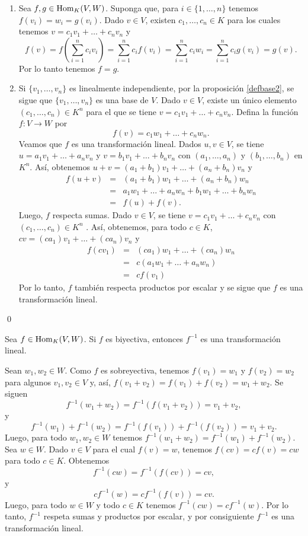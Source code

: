 \dem
\begin{enumerate}
\item Sea $f,g\in\operatorname{Hom}_K(V,W)$. Suponga que, para $i\in\{1,\ldots,n\}$ tenemos $f(v_i)=w_i=g(v_i)$. Dado $v\in V$, existen $c_1,\ldots,c_n\in K$ para los cuales tenemos $v=c_1v_1+\ldots+c_nv_n$ y 
\[
f(v)=f\left(\sum_{i=1}^nc_iv_i\right)=\sum_{i=1}^nc_if(v_i)=\sum_{i=1}^nc_iw_i=\sum_{i=1}^nc_ig(v_i)=g(v).
\]
Por lo tanto tenemos $f=g$.
\item Si $\{v_1,\ldots,v_n\}$ es linealmente independiente, por la proposici\'on \ref{defbase2}, se sigue que $\{v_1,\ldots,v_n\}$ es una base de $V$. Dado $v\in V$, existe un \'unico elemento $(c_1,\ldots, c_n)\in K^n$ para el que se tiene $v=c_1v_1+\ldots+c_nv_n$. Defina la funci\'on $f:V\rightarrow W$ por
\[
f(v)=c_1w_1+\ldots+c_nw_n.
\]
Veamos que $f$ es una transformaci\'on lineal. Dados $u,v\in V$, se tiene $u=a_1v_1+\ldots+a_nv_n$ y $v=b_1v_1+\ldots+b_nv_n$ con $(a_1,\ldots, a_n)$ y $(b_1,\ldots, b_n)$ en $K^n$. As\'i, obtenemos $u+v =  (a_1+b_1)v_1+\ldots+(a_n+b_n)v_n$ y
\begin{eqnarray*}
f(u+v) & = & (a_1+b_1)w_1+\ldots+(a_n+b_n)w_n\\
     & = & a_1w_1+\ldots+a_nw_n+ b_1w_1+\ldots+b_nw_n\\
     & = & f(u)+f(v).
\end{eqnarray*} 
Luego, $f$ respecta sumas.
Dado $v\in V$, se tiene $v=c_1v_1+\ldots+c_nv_n$ con $(c_1,\ldots, c_n)\in K^n$ . As\'i, obtenemos, para todo $c\in K$, $cv = (ca_1)v_1+\ldots+(ca_n)v_n$ y
\begin{eqnarray*}
f(cv_1) & = & (ca_1)w_1+\ldots+(ca_n)w_n\\
     & = & c(a_1w_1+\ldots+a_nw_n)\\
     & = & cf(v_1)
\end{eqnarray*}
Por lo tanto, $f$ tambi\'en respecta productos por escalar y se sigue que $f$ es una transformaci\'on lineal.
\end{enumerate}\qed

\begin{prop}
Sea $f\in\operatorname{Hom}_K(V,W)$. Si $f$ es biyectiva, entonces $f^{-1}$ es una transformaci\'on lineal. 
\end{prop}

\dem Sean $w_1,w_2\in W$. Como $f$ es sobreyectiva, tenemos $f(v_1)=w_1$ y $f(v_2)=w_2$ para algunos $v_1,v_2\in V$ y, as\'i, $f(v_1+v_2)=f(v_1)+f(v_2)=w_1+w_2$. Se siguen
\[
f^{-1}(w_1+w_2)=f^{-1}\left(f(v_1+v_2)\right)=v_1+v_2,
\] 
y
\[
f^{-1}(w_1)+f^{-1}(w_2)=f^{-1}\left(f(v_1)\right)+f^{-1}\left(f(v_2)\right)=v_1+v_2.
\]
Luego, para todo $w_1,w_2\in W$ tenemos  $f^{-1}(w_1+w_2)=f^{-1}(w_1)+f^{-1}(w_2)$.\\
Sea $w\in W$. Dado $v\in V$ para el cual $f(v)=w$, tenemos $f(cv)=cf(v)=cw$ para todo $c\in K$. Obtenemos
\[
f^{-1}(cw)=f^{-1}\left(f(cv)\right)=cv,
\]
y
\[
cf^{-1}(w)=cf^{-1}\left(f(v)\right)=cv.
\]
Luego, para todo $w\in W$ y todo $c\in K$ tenemos $f^{-1}(cw)=cf^{-1}(w)$. Por lo tanto, $f^{-1}$ respeta sumas y productos por escalar, y por consiguiente $f^{-1}$ es una transformaci\'on lineal.

